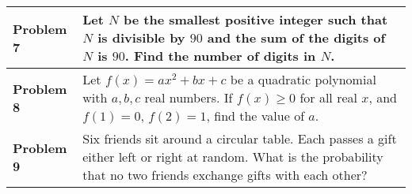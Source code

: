 \begin{table}[!htbp]
{\begin{tabular}{p{}p{}}
\hline
\vspace{0.5em}
\textbf{Problem 7} & \vspace{0.1em}Let $N$ be the smallest positive integer such that $N$ is divisible by $90$ and the sum of the digits of $N$ is $90$. Find the number of digits in $N$. \vspace{0.5em}\\
\hline
\vspace{0.5em}
\textbf{Problem 8} & \vspace{0.1em}Let $f(x)=ax^2+bx+c$ be a quadratic polynomial with $a, b, c$ real numbers. If $f(x) \geq 0$ for all real $x$, and $f(1)=0$, $f(2)=1$, find the value of $a$. \vspace{0.5em}\\
\hline
\vspace{0.5em}
\textbf{Problem 9} & \vspace{0.1em}Six friends sit around a circular table. Each passes a gift either left or right at random. What is the probability that no two friends exchange gifts with each other? \vspace{0.5em}\\
\bottomrule
\end{tabular}
}
\end{table}